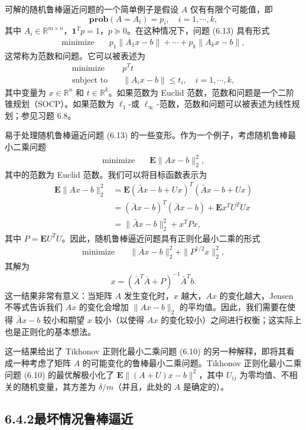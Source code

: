 \documentclass[UTF8,12pt,a4paper,fontset=fandol]{ctexart}
\begin{document}
可解的随机鲁棒逼近问题的一个简单例子是假设 $A$ 仅有有限个可能值，即
\[
\mathbf{prob}(A=A_i)=p_i,\quad i=1,\cdots,k,
\]
其中 $A_i\in\mathbb{R}^{m\times n}$，$\mathbf{1}^Tp=1$，$p\succeq 0$。在这种情况下，问题 (6.13) 具有形式
\[
\begin{aligned}
\text{minimize}\quad & p_1\|A_1x-b\|+\cdots+p_k\|A_kx-b\|,
\end{aligned}
\]
这常称为范数和问题。它可以被表述为
\[
\begin{aligned}
\text{minimize}\quad & p^Tt\\
\text{subject to}\quad & \|A_ix-b\|\leq t_i,\quad i=1,\cdots,k,
\end{aligned}
\]
其中变量为 $x\in\mathbb{R}^n$ 和 $t\in\mathbb{R}^k$。如果范数为 Euclid 范数，范数和问题是一个二阶锥规划（SOCP）。如果范数为 $\ell_1$-或 $\ell_\infty$-范数，范数和问题可以被表述为线性规划；参见习题 6.8。

易于处理随机鲁棒逼近问题 (6.13) 的一些变形。作为一个例子，考虑随机鲁棒最小二乘问题
\[
\begin{aligned}
\text{minimize}\quad & \mathbf{E}\|Ax-b\|_2^2,
\end{aligned}
\]
其中的范数为 Euclid 范数。我们可以将目标函数表示为
\[
\begin{aligned}
\mathbf{E}\|Ax-b\|_2^2
&=\mathbf{E}(\bar{A}x-b+Ux)^T(\bar{A}x-b+Ux)\\
&=(\bar{A}x-b)^T(\bar{A}x-b)+\mathbf{E}x^TU^TUx\\
&=\|\bar{A}x-b\|_2^2+x^TPx,
\end{aligned}
\]
其中 $P=\mathbf{E}U^TU$。因此，随机鲁棒逼近问题具有正则化最小二乘的形式
\[
\begin{aligned}
\text{minimize}\quad & \|\bar{A}x-b\|_2^2+\|P^{1/2}x\|_2^2,
\end{aligned}
\]
其解为
\[
x=(\bar{A}^T\bar{A}+P)^{-1}\bar{A}^Tb.
\]
这一结果非常有意义：当矩阵 $A$ 发生变化时，$x$ 越大，$Ax$ 的变化越大，Jensen 不等式告诉我们 $Ax$ 的变化会增加 $\|Ax-b\|_2$ 的平均值。因此，我们需要在使得 $\bar{A}x-b$ 较小和期望 $x$ 较小（以使得 $Ax$ 的变化较小）之间进行权衡；这实际上也是正则化的基本想法。

这一结果给出了 Tikhonov 正则化最小二乘问题 (6.10) 的另一种解释，即将其看成一种考虑了矩阵 $A$ 的可能变化的鲁棒最小二乘问题。Tikhonov 正则化最小二乘问题 (6.10) 的最优解极小化了 $\mathbf{E}\|(A+U)x-b\|^2$，其中 $U_{ij}$ 为零均值、不相关的随机变量，其方差为 $\delta/m$（并且，此处的 $A$ 是确定的）。

\subsection*{6.4.2\quad 最坏情况鲁棒逼近}
\end{document}
